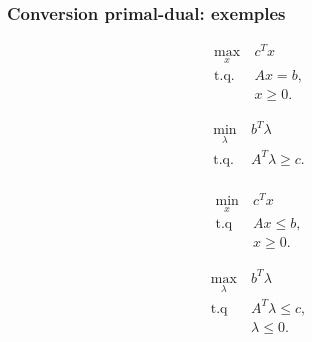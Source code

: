 \documentclass[usepdftitle=false]{beamer}
\begin{document}
\begin{frame}
\frametitle{Conversion primal-dual: exemples}

\begin{minipage}[t]{0.49\textwidth}
\begin{center}
\begin{align*}
\max_x\ & c^Tx \\
\mbox{t.q. } & Ax = b, \\
& x \geq 0. 
\end{align*}
\end{center}
\end{minipage}
\begin{minipage}[t]{0.49\textwidth}
\begin{center}
\begin{align*}
\min_{\lambda}\ & b^T\lambda \\
\mbox{t.q. } & A^T\lambda \geq c. \\
\end{align*}
\end{center}
\end{minipage}

\begin{minipage}[t]{0.49\textwidth}
\begin{center}
\begin{align*}
\min_x\ & c^Tx \\
\mbox{t.q } & Ax \leq b, \\
& x \geq 0. 
\end{align*}
\end{center}
\end{minipage}
\begin{minipage}[t]{0.49\textwidth}
\begin{center}
\begin{align*}
\max_{\lambda}\ & b^T\lambda \\
\mbox{t.q } & A^T\lambda \leq c, \\
& \lambda \leq 0. 
\end{align*}
\end{center}
\end{minipage}

\end{frame}
\end{document}
